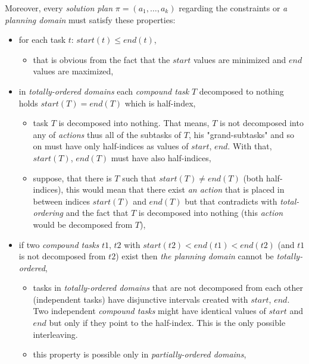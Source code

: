 \medskip\noindent
Moreover, every \emph{solution plan} $\pi = (a_1, \dots, a_k)$ regarding the constraints or \emph{a planning domain} must satisfy these properties:

\begin{itemize}
    \item for each task $t$: $start(t) \leq end(t)$,
    \begin{itemize}
        \item that is obvious from the fact that the $start$ values are minimized and $end$ values are maximized,
    \end{itemize}

    \item in \emph{totally-ordered domains} each \emph{compound task} $T$ decomposed to nothing holds $start(T) = end(T)$ which is half-index,
    \begin{itemize}
        \item task $T$ is decomposed into nothing. That means, $T$ is not decomposed into any of \emph{actions} thus all of the subtasks of $T$, his "grand-subtasks" and so on must have only half-indices as values of $start$, $end$. With that, $start(T)$, $end(T)$ must have also half-indices,

        \item suppose, that there is $T$ such that $start(T) \neq end(T)$ (both half-indices), this would mean that there exist \emph{an action} that is placed in between indices $start(T)$ and $end(T)$ but that contradicts with \emph{total-ordering} and the fact that $T$ is decomposed into nothing (this \emph{action} would be decomposed from $T$),
    \end{itemize}

    \item if two \emph{compound tasks} $t1$, $t2$ with $start(t2) < end(t1) < end(t2)$ (and $t1$ is not decomposed from $t2$) exist then \emph{the planning domain} cannot be \emph{totally-ordered},
    \begin{itemize}
        \item tasks in \emph{totally-ordered domains} that are not decomposed from each other (independent tasks) have disjunctive intervals created with $start$, $end$. Two independent \emph{compound tasks} might have identical values of $start$ and $end$ but only if they point to the half-index. This is the only possible interleaving.

        \item this property is possible only in \emph{partially-ordered domains},
    \end{itemize}


\end{itemize}
